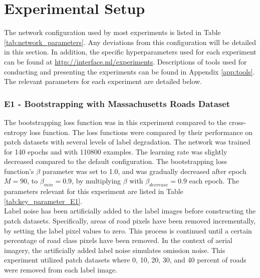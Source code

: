 \section{Experimental Setup}
\label{sec:experimentalSetup}
The network configuration used by most experiments is listed in Table \ref{tab:network_parameters}. Any deviations from this configuration will be detailed in this section. In addition, the specific hyperparameters used for each experiment can be found at \url{http://interface.ml/experiments}. Descriptions of tools used for conducting and presenting the experiments can be found in Appendix \ref{app:tools}. The relevant parameters for each experiment are detailed below.\\ 

\subsubsection{E1 - Bootstrapping with Massachusetts Roads Dataset}
The bootstrapping loss function was in this experiment compared to the cross-entropy loss function. The loss functions were compared by their performance on patch datasets with several levels of label degradation. The network was trained for 140 epochs and with 110800 examples. The learning rate was slightly decreased compared to the default configuration. The bootstrapping loss function's $\beta$ parameter was set to 1.0, and was gradually decreased after epoch $M =90$, to $\beta_{min} = 0.9$, by multiplying $\beta$ with $\beta_{decrease}=0.9$ each epoch. The parameters relevant for this experiment are listed in Table \ref{tab:key_parameter_E1}.\\

Label noise has been artificially added to the label images before constructing the patch datasets. Specifically, areas of road pixels have been removed incrementally, by setting the label pixel values to zero. This process is continued until a certain percentage of road class pixels have been removed. In the context of aerial imagery, the artificially added label noise simulates omission noise. This experiment utilized patch datasets where 0, 10, 20, 30, and 40 percent of roads were removed from each label image.\\ 

